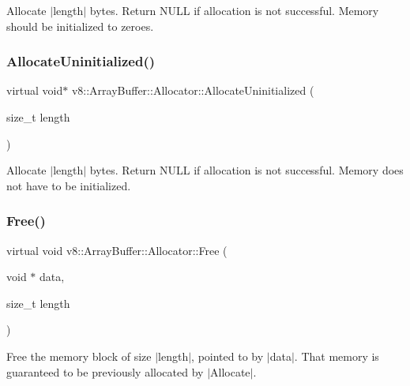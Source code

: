 Allocate $\vert$length$\vert$ bytes. Return N\+U\+LL if allocation is not successful. Memory should be initialized to zeroes. \mbox{\label{classv8_1_1ArrayBuffer_1_1Allocator_a92b2d5c0a826d3c435e12f3ee178f37a}} 
\subsubsection{\texorpdfstring{Allocate\+Uninitialized()}{AllocateUninitialized()}}
{\footnotesize\ttfamily virtual void$\ast$ v8\+::\+Array\+Buffer\+::\+Allocator\+::\+Allocate\+Uninitialized (\begin{DoxyParamCaption}\item[{size\+\_\+t}]{length }\end{DoxyParamCaption})\hspace{0.3cm}{\ttfamily [pure virtual]}}

Allocate $\vert$length$\vert$ bytes. Return N\+U\+LL if allocation is not successful. Memory does not have to be initialized. \mbox{\label{classv8_1_1ArrayBuffer_1_1Allocator_a419f59d2a103a5a8863809d7977c9cd8}} 
\subsubsection{\texorpdfstring{Free()}{Free()}}
{\footnotesize\ttfamily virtual void v8\+::\+Array\+Buffer\+::\+Allocator\+::\+Free (\begin{DoxyParamCaption}\item[{void $\ast$}]{data,  }\item[{size\+\_\+t}]{length }\end{DoxyParamCaption})\hspace{0.3cm}{\ttfamily [pure virtual]}}

Free the memory block of size $\vert$length$\vert$, pointed to by $\vert$data$\vert$. That memory is guaranteed to be previously allocated by $\vert$\+Allocate$\vert$. \mbox{\label{classv8_1_1ArrayBuffer_1_1Allocator_ab274d606bbc87a2a41f114d55d6da331}} 
